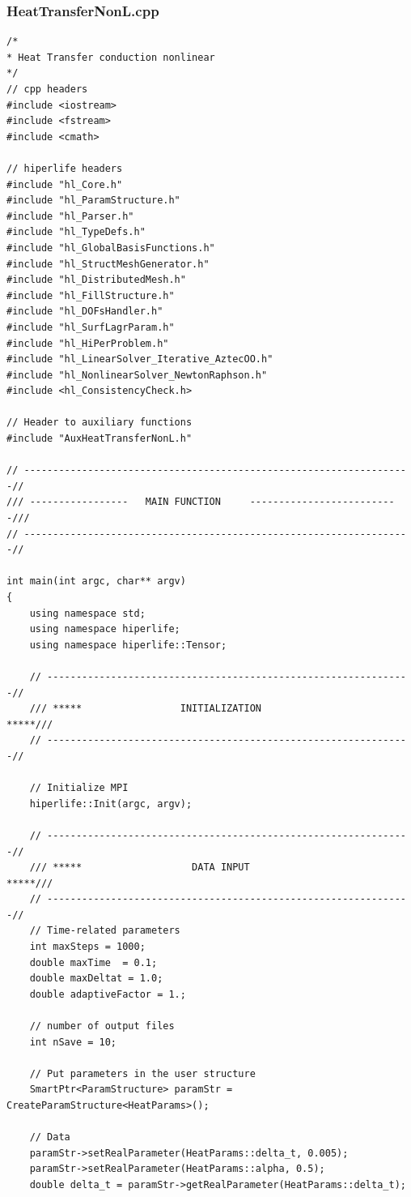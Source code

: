 \documentclass[]{article}
\begin{document}
\subsubsection{HeatTransferNonL.cpp} \label{sec: m.cpp}
\nolinenumbers
\begin{lstlisting}
/*
* Heat Transfer conduction nonlinear
*/
// cpp headers
#include <iostream>
#include <fstream>
#include <cmath>

// hiperlife headers
#include "hl_Core.h"
#include "hl_ParamStructure.h"
#include "hl_Parser.h"
#include "hl_TypeDefs.h"                                      
#include "hl_GlobalBasisFunctions.h"
#include "hl_StructMeshGenerator.h"         
#include "hl_DistributedMesh.h"                                           
#include "hl_FillStructure.h"
#include "hl_DOFsHandler.h"
#include "hl_SurfLagrParam.h"
#include "hl_HiPerProblem.h"
#include "hl_LinearSolver_Iterative_AztecOO.h"
#include "hl_NonlinearSolver_NewtonRaphson.h"
#include <hl_ConsistencyCheck.h>

// Header to auxiliary functions
#include "AuxHeatTransferNonL.h"

// -------------------------------------------------------------------//
/// -----------------   MAIN FUNCTION     --------------------------///
// -------------------------------------------------------------------//

int main(int argc, char** argv)
{
	using namespace std;
	using namespace hiperlife;
	using namespace hiperlife::Tensor;
	
	// ---------------------------------------------------------------//
	/// *****                 INITIALIZATION                    *****///
	// ---------------------------------------------------------------//
	
	// Initialize MPI
	hiperlife::Init(argc, argv);
	
	// ---------------------------------------------------------------//
	/// *****                   DATA INPUT                      *****///
	// ---------------------------------------------------------------//
	// Time-related parameters
	int maxSteps = 1000;
	double maxTime  = 0.1;
	double maxDeltat = 1.0;
	double adaptiveFactor = 1.;
	
	// number of output files 
	int nSave = 10;
	
	// Put parameters in the user structure
	SmartPtr<ParamStructure> paramStr = CreateParamStructure<HeatParams>();
	
	// Data
	paramStr->setRealParameter(HeatParams::delta_t, 0.005);
	paramStr->setRealParameter(HeatParams::alpha, 0.5);
	double delta_t = paramStr->getRealParameter(HeatParams::delta_t);
	

\end{lstlisting}
\end{document}
